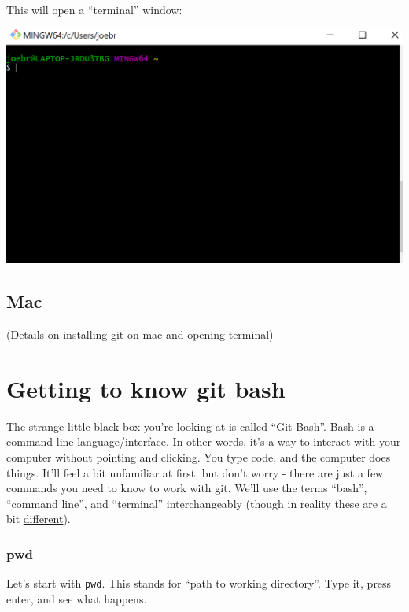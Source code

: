 \documentclass[
]{book}
\begin{document}
This will open a ``terminal'' window:

\includegraphics{img/git4.png}

\hypertarget{mac}{%
\subsection*{Mac}\label{mac}}

(Details on installing git on mac and opening terminal)

\hypertarget{getting-to-know-git-bash}{%
\section*{Getting to know git bash}\label{getting-to-know-git-bash}}

The strange little black box you're looking at is called ``Git Bash''. Bash is a command line language/interface. In other words, it's a way to interact with your computer without pointing and clicking. You type code, and the computer does things. It'll feel a bit unfamiliar at first, but don't worry - there are just a few commands you need to know to work with git. We'll use the terms ``bash'', ``command line'', and ``terminal'' interchangeably (though in reality these are a bit \href{https://superuser.com/questions/880344/what-is-the-difference-between-terminal-and-bash}{different}).

\hypertarget{pwd}{%
\subsubsection*{pwd}\label{pwd}}

Let's start with \texttt{pwd}. This stands for ``path to working directory''. Type it, press enter, and see what happens.
\end{document}
